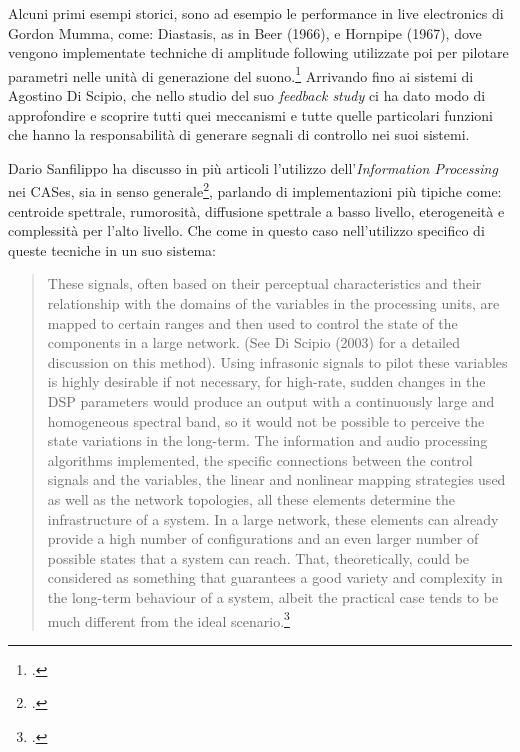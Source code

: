 Alcuni primi esempi storici,
sono ad esempio le performance in live electronics di Gordon Mumma, 
come: Diastasis, as in Beer (1966), e Hornpipe (1967), 
dove vengono implementate techniche di amplitude following utilizzate 
poi per pilotare parametri nelle unità di generazione del suono.\footcite{sanfilippo_time-domain_2021}
Arrivando fino ai sistemi di Agostino Di Scipio, che nello studio del suo
\emph{feedback study} ci ha dato modo di approfondire e scoprire
tutti quei meccanismi e tutte quelle particolari funzioni che hanno la responsabilità
di generare segnali di controllo nei suoi sistemi. 

Dario Sanfilippo ha discusso in più articoli l'utilizzo dell'\textit{Information Processing} 
nei CASes, sia in senso generale\footcite{sanfilippo_time-domain_2021}, 
parlando di implementazioni più tipiche come: 
centroide spettrale, rumorosità, diffusione spettrale a basso livello, eterogeneità e
complessità per l'alto livello.
Che come in questo caso nell'utilizzo specifico di queste tecniche 
in un suo sistema:

\begin{quote}
    These signals, often based on
    their perceptual characteristics and their relationship with the domains of the variables
    in the processing units, are mapped to certain ranges and then used to control the state
    of the components in a large network. (See Di Scipio (2003) for a detailed discussion
    on this method). Using infrasonic signals to pilot these variables is highly desirable if
    not necessary, for high-rate, sudden changes in the DSP parameters would produce an
    output with a continuously large and homogeneous spectral band, so it would not be
    possible to perceive the state variations in the long-term.
    The information and audio processing algorithms implemented, the specific connections 
    between the control signals and the variables, the linear and nonlinear mapping strategies 
    used as well as the network topologies, all these elements determine the
    infrastructure of a system. In a large network, these elements can already provide a high
    number of configurations and an even larger number of possible states that a system
    can reach. That, theoretically, could be considered as something that guarantees a good
    variety and complexity in the long-term behaviour of a system, albeit the practical case
    tends to be much different from the ideal scenario.\footcite{sanfilippo_time-variant_2018}
\end{quote}

